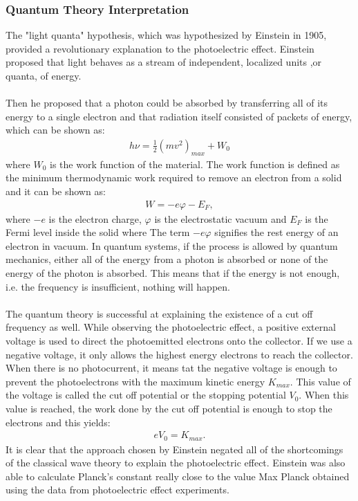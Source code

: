 		\subsubsection{Quantum Theory Interpretation}
			The "light quanta" hypothesis, which was hypothesized by Einstein in 1905, provided a revolutionary explanation to the photoelectric effect. Einstein proposed that light behaves as a stream of independent, localized units ,or quanta, of energy. 
			\\
			\\
			Then he proposed that a photon could be absorbed by transferring all of its energy to a single electron and that radiation itself consisted of packets of energy, which can be shown as:
			\begin{align*}
				h \nu = \frac{1}{2} (m v^2)_{max} + W_0
			\end{align*}
			where $W_0$ is the work function of the material. The work function is defined as the minimum thermodynamic work required to remove an electron from a solid and it can be shown as:
			\begin{align*}
				W = -e \varphi - E_F,
			\end{align*}
			where $-e$ is the electron charge, $\varphi$ is the electrostatic vacuum and $E_F$ is the Fermi level inside the solid where The term $-e \varphi$ signifies the rest energy of an electron in vacuum. In quantum systems, if the process is allowed by quantum mechanics, either all of the energy from a photon is absorbed or none of the energy of the photon is absorbed. This means that if the energy is not enough, i.e. the frequency is insufficient,  nothing will happen.
			\\
			\\
			The quantum theory is successful at explaining the existence of a cut off frequency as well. While observing the photoelectric effect, a positive external voltage is used to direct the photoemitted electrons onto the collector. If we use a negative voltage, it only allows the highest energy electrons to reach the collector. When there is no photocurrent, it means tat the negative voltage is enough to prevent the photoelectrons with the maximum kinetic energy $K_{max}$. This value of the voltage is called the cut off potential or the stopping potential $V_0$. When this value is reached, the work done by the cut off potential is enough to stop the electrons and this yields:
			\begin{align*}
				e V_0 = K_{max}.
			\end{align*}
			It is clear that the approach chosen by Einstein negated all of the shortcomings of the classical wave theory to explain the photoelectric effect. Einstein was also able to calculate Planck's constant really close to the value Max Planck obtained using the data from photoelectric effect experiments.
	
